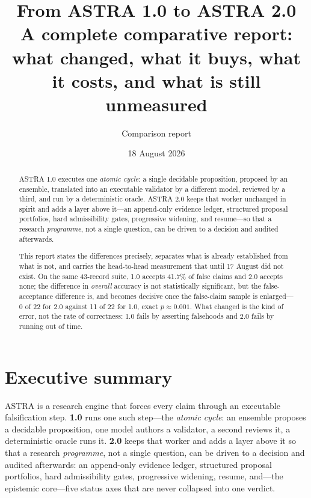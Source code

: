 \documentclass[11pt,a4paper]{article}
\title{\bfseries From ASTRA 1.0 to ASTRA 2.0\\
\large A complete comparative report: what changed, what it buys,
what it costs, and what is still unmeasured}
\author{Comparison report}
\date{18 August 2026}
\begin{document}
\maketitle

\begin{abstract}
\noindent
ASTRA 1.0 executes one \emph{atomic cycle}: a single decidable proposition,
proposed by an ensemble, translated into an executable validator by a different
model, reviewed by a third, and run by a deterministic oracle. ASTRA 2.0 keeps
that worker unchanged in spirit and adds a layer above it---an append-only
evidence ledger, structured proposal portfolios, hard admissibility gates,
progressive widening, and resume---so that a research \emph{programme}, not a
single question, can be driven to a decision and audited afterwards.

This report states the differences precisely, separates what is already
established from what is not, and carries the head-to-head measurement that until 17 August did not exist. On the same 43-record suite, 1.0 accepts 41.7\% of false claims and 2.0 accepts
none; the difference in \emph{overall} accuracy is not statistically significant,
but the false-acceptance difference is, and becomes decisive once the false-claim
sample is enlarged---0 of 22 for 2.0 against 11 of 22 for 1.0, exact
$p\approx0.001$. What changed is the kind of error, not the rate of correctness:
1.0 fails by asserting falsehoods and 2.0 fails by running out of time.
\end{abstract}

\section{Executive summary}

ASTRA is a research engine that forces every claim through an executable
falsification step. \textbf{1.0} runs one such step---the \emph{atomic cycle}: an
ensemble proposes a decidable proposition, one model authors a validator, a
second reviews it, a deterministic oracle runs it. \textbf{2.0} keeps that worker
and adds a layer above it so that a research \emph{programme}, not a single
question, can be driven to a decision and audited afterwards: an append-only
evidence ledger, structured proposal portfolios, hard admissibility gates,
progressive widening, resume, and---the epistemic core---five status axes that
are never collapsed into one verdict.
\end{document}
